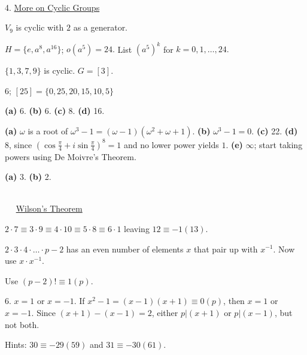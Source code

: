 \documentclass[12pt]{book}
\theoremstyle{definition}
\begin{document}
~\\[.1in]
{\Large 4. \underline{More on Cyclic Groups}}

\begin{oddenumerate}
	\item  $ V_9 $ is cyclic with $ 2 $ as a generator. 
	
	\item $ H=\{e,a^8,a^{16}\} $; $ o(a^5)=24. $ List $ (a^5)^k $ for $ k=0,1,\dots, 24. $
	
	\item $\{1,3,7,9\}$ is cyclic. $ G=[3]. $
	
	\item $ 6 $; $ [25]=\{0,25,20,15,10,5\} $
	
	\item \textbf{(a)} 6. \textbf{(b)} 6. \textbf{(c)} 8. \textbf{(d)} 16.
	
	\item \textbf{(a)} $\omega$ is a root of $ \omega^3-1=(\omega-1)(\omega^2+\omega+1). $ \textbf{(b)} $\omega^3-1=0$. \textbf{(c)} 22. \textbf{(d)} 8, since $ (\cos\frac{\pi}{4}+i\sin\frac{\pi}{4})^8=1 $ and no lower power yields $ 1 $. \textbf{(e)} $ \infty $; start taking powers using De Moivre's Theorem.
	
	
	\item \textbf{(a)} 3. \textbf{(b)} 2. 
	
\end{oddenumerate}


~\\[.1in]
{\large ~~ \underline{Wilson's Theorem}}

\begin{oddenumerate}
	\item  $ 2\cdot 7 \equiv 3\cdot 9 \equiv 4\cdot 10 \equiv 5\cdot 8 \equiv 6\cdot 1$ leaving $ 12\equiv -1(13) $.
	
	\item $ 2\cdot 3 \cdot 4\cdot \dots \cdot p-2 $ has an even number of elements $ x $ that pair up with $ x^{-1} $. Now use $ x\cdot x^{-1} $.
	
	\item Use $ (p-2)! \equiv 1(p). $
	
	\item[6.] $ x=1 $ or $ x=-1. $ If $ x^2-1=(x-1)(x+1)\equiv 0(p) $, then $ x=1  $ or $ x=-1 $. Since $ (x+1)-(x-1)=2 $, either $ p \vert (x+1) $ or $ p \vert (x-1) $, but not both. 
	
	\item Hints: $ 30 \equiv -29(59) $ and $ 31\equiv -30(61) $.
	
\end{oddenumerate}
\end{document}
